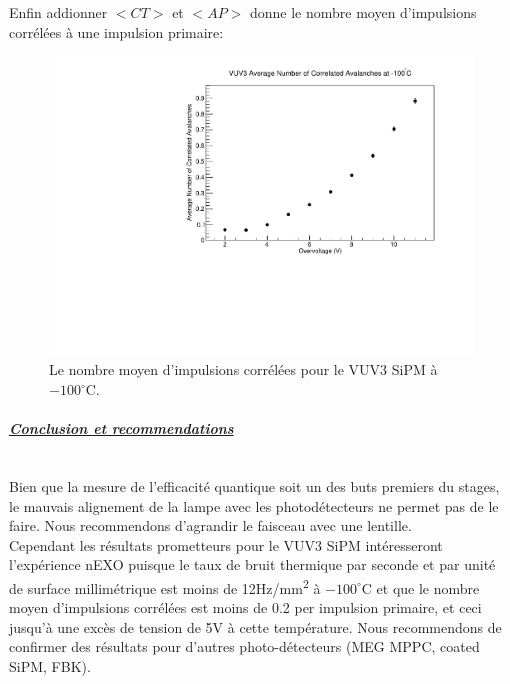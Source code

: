 \documentclass[a4paper, 11pt]{report}%
\begin{document}
  \newpage
  
  Enfin addionner $<CT>$ et $<AP>$ donne le nombre moyen d'impulsions corr\'el\'ees \`a une impulsion primaire:
  
  \begin{figure}[!hbtp]
    \centering
    \includegraphics[totalheight=0.35\textwidth,trim=.5cm 0cm 1.8cm 0.9cm, clip=true]{../Pictures/VUV3_CA_vs_OV.pdf}
    \caption{Le nombre moyen d'impulsions corr\'el\'ees pour le VUV3 SiPM \`a $-100^{\circ}$C.}
    \label{fig:CA}
  \end{figure}
  
  
\paragraph{\textit{\underline{Conclusion et recommendations}}}
  \leavevmode
  \\
  
  Bien que la mesure de l'efficacit\'e quantique soit un des buts premiers du stages, le mauvais alignement de la lampe avec les photod\'etecteurs
  ne permet pas de le faire. Nous recommendons d'agrandir le faisceau avec une lentille. 
  \\
  
  Cependant les r\'esultats prometteurs pour le VUV3 SiPM int\'eresseront l'exp\'erience nEXO puisque le taux de bruit thermique par seconde et par 
  unit\'e de 
  surface millim\'etrique est moins de 12Hz/mm\textsuperscript{2} \`a $-100^{\circ}$C et que le nombre moyen d'impulsions 
  corr\'el\'ees est moins de 0.2 per impulsion primaire, et ceci jusqu'\`a une exc\`es de tension de 5V \`a cette temp\'erature. 
  Nous recommendons de confirmer des r\'esultats pour d'autres photo-d\'etecteurs (MEG MPPC, coated SiPM, FBK). 
  
\end{document}
